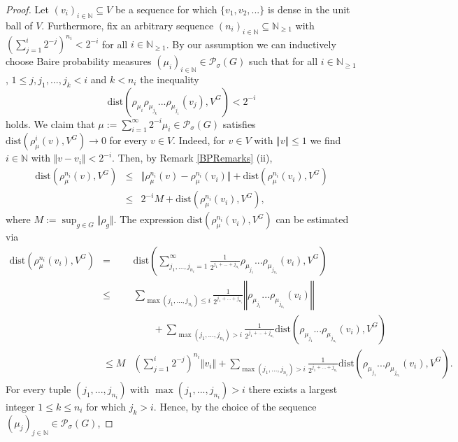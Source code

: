 \documentclass[a4paper,11pt,reqno]{amsart}
\numberwithin{equation}{section}
\theoremstyle{definition}
\theoremstyle{remark}
\theoremstyle{remark}
\begin{document}
\begin{proof} Let $(v_{i})_{i\in\mathbb{N}}\subseteq V$ be a sequence for which $\{v_{1},v_{2},...\}$ is dense in the unit ball of $V$. Furthermore, fix an arbitrary sequence $(n_{i})_{i\in\mathbb{N}}\subseteq\mathbb{N}_{\geq1}$ with $(\sum_{j=1}^{i}2^{-j})^{n_{i}}<2^{-i}$ for all $i\in\mathbb{N}_{\geq1}$. By our assumption we can inductively choose Baire probability measures $(\mu_{i})_{i\in\mathbb{N}}\in\mathcal{P}_{\sigma}(G)$ such that for all $i\in\mathbb{N}_{\geq1}$, $1\leq j,j_{1},...,j_{k}<i$ and $k<n_{i}$ the inequality 
\[
\text{dist}\left(\rho_{\mu_{i}}\rho_{\mu_{j_{k}}}...\rho_{\mu_{j_{1}}}(v_{j}),V^{G}\right)<2^{-i}
\]
holds. We claim that $\mu:=\sum_{i=1}^{\infty}2^{-i}\mu_{i}\in\mathcal{P}_{\sigma}(G)$ satisfies $\text{dist}\left(\rho_{\mu}^{i}(v),V^{G}\right)\rightarrow0$ for every $v\in V$. Indeed, for $v\in V$ with $\Vert v\Vert\leq1$ we find $i\in\mathbb{N}$ with $\Vert v-v_{i}\Vert<2^{-i}$. Then, by Remark \ref{BPRemarks} (ii), 
\begin{eqnarray*}
\text{dist}\left(\rho_{\mu}^{n_{i}}(v),V^{G}\right) & \leq & \Vert\rho_{\mu}^{n_{i}}(v)-\rho_{\mu}^{n_{i}}(v_{i})\Vert+\text{dist}\left(\rho_{\mu}^{n_{i}}(v_{i}),V^{G}\right)\\
 & \leq & 2^{-i}M+\text{dist}\left(\rho_{\mu}^{n_{i}}(v_{i}),V^{G}\right),
\end{eqnarray*}
where $M:=\sup_{g\in G}\Vert\rho_{g}\Vert$. The expression $\text{dist}\left(\rho_{\mu}^{n_{i}}(v_{i}),V^{G}\right)$ can be estimated via 
\begin{eqnarray*}
\text{dist}\left(\rho_{\mu}^{n_{i}}(v_{i}),V^{G}\right) & = & \text{dist}\left(\sum_{j_{1},...,j_{n_{i}}=1}^{\infty}\frac{1}{2^{j_{1}+...+j_{n_{i}}}}\rho_{\mu_{j_{1}}}...\rho_{\mu_{j_{n_{i}}}}(v_{i}),V^{G}\right)\\
 & \leq & \sum_{\max(j_{1},...,j_{n_{i}})\leq i}\frac{1}{2^{j_{1}+...+j_{n_{i}}}}\left\Vert \rho_{\mu_{j_{1}}}...\rho_{\mu_{j_{n_{i}}}}(v_{i})\right\Vert \\
 &  & \qquad+\sum_{\max(j_{1},...,j_{n_{i}})>i}\frac{1}{2^{j_{1}+...+j_{n_{i}}}}\text{dist}\left(\rho_{\mu_{j_{1}}}...\rho_{\mu_{j_{n_{i}}}}(v_{i}),V^{G}\right)\\
 & \leq M & \left(\sum_{j=1}^{i}2^{-j}\right)^{n_{i}}\left\Vert v_{i}\right\Vert +\sum_{\max(j_{1},...,j_{n_{i}})>i}\frac{1}{2^{j_{1}+...+j_{n_{i}}}}\text{dist}\left(\rho_{\mu_{j_{1}}}...\rho_{\mu_{j_{n_{i}}}}(v_{i}),V^{G}\right).
\end{eqnarray*}
For every tuple $(j_{1},...,j_{n_{i}})$ with $\max(j_{1},...,j_{n_{i}})>i$ there exists a largest integer $1\leq k\leq n_{i}$ for which $j_{k}>i$. Hence, by the choice of the sequence $(\mu_{j})_{j\in\mathbb{N}}\in\mathcal{P}_{\sigma}(G)$, 

\end{proof}
\end{document}
